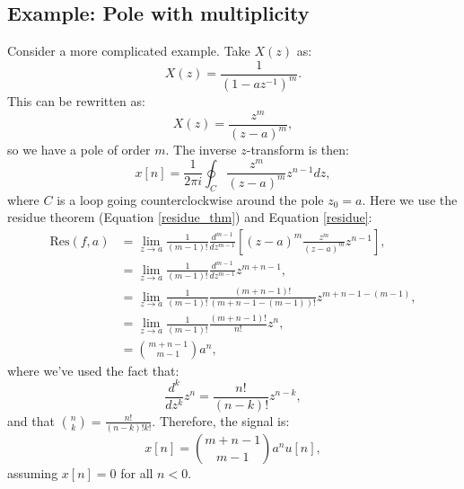 \subsection{Example: Pole with multiplicity}
Consider a more complicated example. Take $X(z)$ as:
\[X(z)=\frac{1}{(1-az^{-1})^{m}}.\]
This can be rewritten as:
\begin{equation}
    X(z) = \frac{z^{m}}{(z-a)^{m}},
\end{equation}
so we have a pole of order $m$. The inverse $z$-transform is then:
\begin{equation}
    x[n] = \frac{1}{2\pi i}\oint_{C}\frac{z^{m}}{(z-a)^{m}}z^{n-1}dz,
\end{equation}
where $C$ is a loop going counterclockwise around the pole $z_{0}=a$.
Here we use the residue theorem (Equation \ref{residue_thm}) and Equation \ref{residue}:
\begin{align}
    \text{Res}(f,a) & = \lim_{z\to a}\frac{1}{(m-1)!}\frac{d^{m-1}}{dz^{m-1}}\left[(z-a)^{m}\frac{z^{m}}{(z-a)^{m}}z^{n-1}\right], \\
                    & = \lim_{z\to a}\frac{1}{(m-1)!}\frac{d^{m-1}}{dz^{m-1}}z^{m+n-1},                                            \\
                    & = \lim_{z\to a}\frac{1}{(m-1)!}\frac{(m+n-1)!}{(m+n-1-(m-1))!}z^{m+n-1-(m-1)},                               \\
                    & = \lim_{z\to a}\frac{1}{(m-1)!}\frac{(m+n-1)!}{n!}z^{n},                                                     \\
                    & = \binom{m+n-1}{m-1}a^{n},
\end{align}
where we've used the fact that:
\begin{equation}
    \frac{d^{k}}{dz^{k}}z^{n} = \frac{n!}{(n-k)!} z^{n-k},
\end{equation}
and that $\binom{n}{k}=\frac{n!}{(n-k)!k!}$. Therefore, the signal is:
\begin{equation}
    x[n] = \binom{m+n-1}{m-1}a^{n}u[n],
\end{equation}
assuming $x[n]=0$ for all $n<0$.





